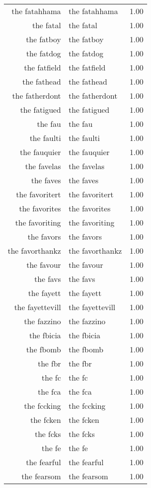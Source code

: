 \begin{table}[ht]
\begin{tabular}{rlr}
  the fatahhama & the fatahhama & 1.00 \\ 
  the fatal & the fatal & 1.00 \\ 
  the fatboy & the fatboy & 1.00 \\ 
  the fatdog & the fatdog & 1.00 \\ 
  the fatfield & the fatfield & 1.00 \\ 
  the fathead & the fathead & 1.00 \\ 
  the fatherdont & the fatherdont & 1.00 \\ 
  the fatigued & the fatigued & 1.00 \\ 
  the fau & the fau & 1.00 \\ 
  the faulti & the faulti & 1.00 \\ 
  the fauquier & the fauquier & 1.00 \\ 
  the favelas & the favelas & 1.00 \\ 
  the faves & the faves & 1.00 \\ 
  the favoritert & the favoritert & 1.00 \\ 
  the favorites & the favorites & 1.00 \\ 
  the favoriting & the favoriting & 1.00 \\ 
  the favors & the favors & 1.00 \\ 
  the favorthankz & the favorthankz & 1.00 \\ 
  the favour & the favour & 1.00 \\ 
  the favs & the favs & 1.00 \\ 
  the fayett & the fayett & 1.00 \\ 
  the fayettevill & the fayettevill & 1.00 \\ 
  the fazzino & the fazzino & 1.00 \\ 
  the fbicia & the fbicia & 1.00 \\ 
  the fbomb & the fbomb & 1.00 \\ 
  the fbr & the fbr & 1.00 \\ 
  the fc & the fc & 1.00 \\ 
  the fca & the fca & 1.00 \\ 
  the fccking & the fccking & 1.00 \\ 
  the fcken & the fcken & 1.00 \\ 
  the fcks & the fcks & 1.00 \\ 
  the fe & the fe & 1.00 \\ 
  the fearful & the fearful & 1.00 \\ 
  the fearsom & the fearsom & 1.00 \\ 

\end{tabular}
\end{table}
